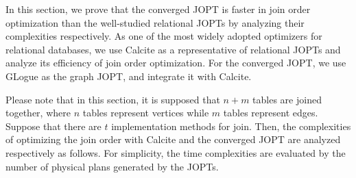 \documentclass[sigconf, nonacm]{acmart}
\begin{document}
In this section, we prove that the converged JOPT is faster in join order optimization than the well-studied relational JOPTs by analyzing their complexities respectively.
As one of the most widely adopted optimizers for relational databases, we use Calcite \cite{calcite,columbia} as a representative of relational JOPTs and analyze its efficiency of join order optimization.
For the converged JOPT, we use GLogue \cite{GLogS} as the graph JOPT, and integrate it with Calcite.

Please note that in this section, it is supposed that $n + m$ tables are joined together, where $n$ tables represent vertices while $m$ tables represent edges.
Suppose that there are $t$ implementation methods for join.
Then, the complexities of optimizing the join order with Calcite and the converged JOPT are analyzed respectively as follows.
For simplicity, the time complexities are evaluated by the number of physical plans generated by the JOPTs.
\end{document}
